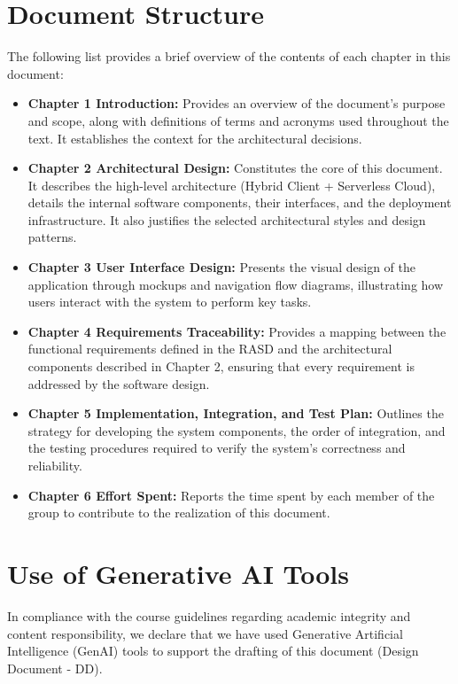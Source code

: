 \section{Document Structure}
The following list provides a brief overview of the contents of each chapter in this document:

\begin{itemize}
    \item \textbf{Chapter 1 Introduction:} Provides an overview of the document's purpose and scope, along with definitions of terms and acronyms used throughout the text. It establishes the context for the architectural decisions.
    
    \item \textbf{Chapter 2 Architectural Design:} Constitutes the core of this document. It describes the high-level architecture (Hybrid Client + Serverless Cloud), details the internal software components, their interfaces, and the deployment infrastructure. It also justifies the selected architectural styles and design patterns.
    
    \item \textbf{Chapter 3 User Interface Design:} Presents the visual design of the application through mockups and navigation flow diagrams, illustrating how users interact with the system to perform key tasks.
    
    \item \textbf{Chapter 4 Requirements Traceability:} Provides a mapping between the functional requirements defined in the RASD and the architectural components described in Chapter 2, ensuring that every requirement is addressed by the software design.
    
    \item \textbf{Chapter 5 Implementation, Integration, and Test Plan:} Outlines the strategy for developing the system components, the order of integration, and the testing procedures required to verify the system's correctness and reliability.
    
    \item \textbf{Chapter 6 Effort Spent:} Reports the time spent by each member of the group to contribute to the realization of this document.
\end{itemize}

\section{Use of Generative AI Tools}
In compliance with the course guidelines regarding academic integrity and content responsibility, we declare that we have used Generative Artificial Intelligence (GenAI) tools to support the drafting of this document (Design Document - DD).

